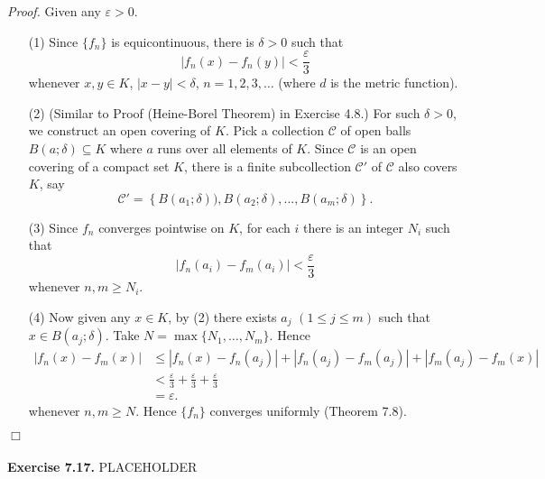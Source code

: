\documentclass{article}
\begin{document}
\emph{Proof.}
Given any $\varepsilon > 0$.
\begin{enumerate}
  \item[(1)]
  Since $\{f_n\}$ is equicontinuous, there is $\delta > 0$ such that
  \[
    |f_n(x) - f_n(y)| < \frac{\varepsilon}{3}
  \]
  whenever $x,y \in K$, $|x-y| < \delta$, $n = 1,2,3,\ldots$
  (where $d$ is the metric function).

  \item[(2)]
  (Similar to Proof (Heine-Borel Theorem) in Exercise 4.8.)
  For such $\delta > 0$, we construct an open covering of $K$.
  Pick a collection $\mathscr{C}$ of open balls
  $B(a;\delta) \subseteq K$
  where $a$ runs over all elements of $K$.
  Since $\mathscr{C}$ is an open covering of a compact set $K$,
  there is a finite subcollection $\mathscr{C}'$ of $\mathscr{C}$
  also covers $K$, say
  \[
    \mathscr{C}'
    = \left\{B(a_1;\delta)), B(a_2;\delta), ..., B(a_m;\delta) \right\}.
  \]

  \item[(3)]
  Since $f_n$ converges pointwise on $K$,
  for each $i$ there is an integer $N_i$ such that
  \[
    |f_n(a_i)-f_m(a_i)| < \frac{\varepsilon}{3}
  \]
  whenever $n,m \geq N_i$.

  \item[(4)]
  Now given any $x \in K$, by (2) there exists $a_j$ $(1 \leq j \leq m)$
  such that $x \in B(a_j;\delta)$.
  Take $N = \max\{N_1,\ldots,N_m\}$.
  Hence
  \begin{align*}
    |f_n(x)-f_m(x)|
    &\leq
    |f_n(x)-f_n(a_j)| + |f_n(a_j)-f_m(a_j)| + |f_m(a_j)-f_m(x)| \\
    &<
    \frac{\varepsilon}{3} + \frac{\varepsilon}{3} + \frac{\varepsilon}{3} \\
    &=
    \varepsilon.
  \end{align*}
  whenever $n,m \geq N$.
  Hence $\{f_n\}$ converges uniformly (Theorem 7.8).
\end{enumerate}
$\Box$ \\\\






\textbf{Exercise 7.17.}
PLACEHOLDER



\end{document}
